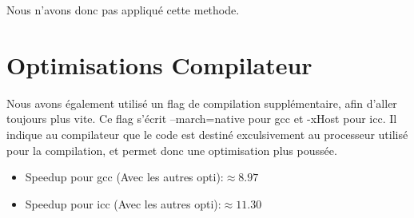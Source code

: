 Nous n'avons donc pas appliqué cette methode.

\section*{Optimisations Compilateur}

Nous avons également utilisé un flag de compilation supplémentaire, afin d'aller toujours plus vite.
Ce flag s'écrit --march=native pour gcc et -xHost pour icc. Il indique au compilateur que le code est destiné exculsivement au processeur utilisé pour la compilation, et permet donc une optimisation plus poussée.\\
\begin{itemize}
    \item{Speedup pour gcc (Avec les autres opti):$\approx 8.97$}
    \item{Speedup pour icc (Avec les autres opti):$\approx 11.30$}\\
\end{itemize}



